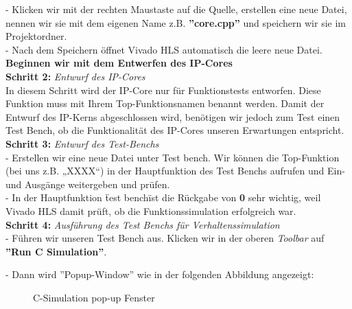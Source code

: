 \documentclass[a4paper]{report}
\begin{document}
- Klicken wir mit der rechten Maustaste auf die Quelle, erstellen eine neue Datei, nennen wir sie mit dem eigenen Name z.B. \textbf{''core.cpp''} und speichern wir sie im Projektordner.\\
 
- Nach dem Speichern öffnet Vivado HLS automatisch die leere neue Datei. \\

 \textbf{Beginnen wir mit dem Entwerfen des IP-Cores}\\

\textbf{Schritt 2:} \textit{Entwurf des IP-Cores}\\

In diesem Schritt wird der IP-Core nur für Funktionstests entworfen. Diese Funktion muss mit Ihrem Top-Funktionsnamen benannt werden. Damit der Entwurf des IP-Kerns abgeschlossen wird, benötigen wir jedoch zum Test einen Test Bench, ob die Funktionalität des IP-Cores unseren Erwartungen entspricht.\\

\textbf{Schritt 3:} \textit{Entwurf des Test-Benchs}\\

- Erstellen wir eine neue Datei unter Test bench. Wir können die Top-Funktion (bei uns z.B. „XXXX“) in der Hauptfunktion des Test Benchs aufrufen und Ein- und Ausgänge weitergeben und prüfen.\\

- In der Hauptfunktion \"test bench\" ist die Rückgabe von \textbf{0} sehr wichtig, weil Vivado HLS damit prüft, ob die Funktionssimulation erfolgreich war.\\

\textbf{Schritt 4:} \textit{Ausführung des Test Benchs für Verhaltenssimulation}\\

- Führen wir unseren Test Bench aus. Klicken wir in der oberen \textit{Toolbar} auf \textbf{''Run C Simulation''}.

- Dann wird ''Popup-Window'' wie in der folgenden Abbildung angezeigt:\\

\begin{figure}[H]
\centering
{}
\caption{C-Simulation pop-up Fenster}
\label{fig:C_Simulation_pop_-_up_Fenster}
\end{figure}
\end{document}
